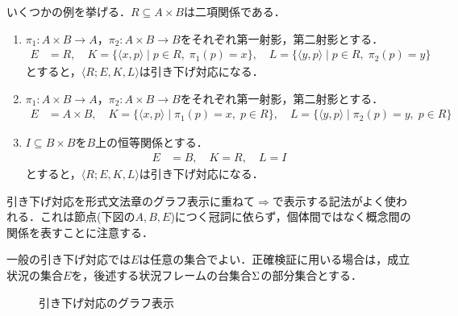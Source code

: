\documentclass[../../main-detail.tex]{subfiles}
\begin{document}
いくつかの例を挙げる．$R\subseteq A \times B$は二項関係である．
\begin{enumerate}
    \item $\pi_1:A\times B \to A$，$\pi_2:A\times B \to B$をそれぞれ第一射影，第二射影とする．
    \begin{align*}
        E &= R,\quad K = \{\langle x, p\rangle \mid p\in R,\; \pi_1(p) = x\},\quad L = \{\langle y, p\rangle \mid p\in R,\; \pi_2(p) = y\}
    \end{align*}
    とすると，$\langle R; E, K, L\rangle$は引き下げ対応になる．
    \item $\pi_1:A\times B \to A$，$\pi_2:A\times B \to B$をそれぞれ第一射影，第二射影とする．
    \begin{align*}
        E &= A\times B,\quad K = \{\langle x, p\rangle \mid \pi_1(p) = x,\; p\in R\},\quad L = \{\langle y, p\rangle \mid \pi_2(p) = y,\; p\in R\}
    \end{align*}
    \item $I \subseteq B\times B$を$B$上の恒等関係とする．
    \begin{align*}
        E &= B,\quad K = R,\quad L = I
    \end{align*}
    とすると，$\langle R; E, K, L\rangle$は引き下げ対応になる．
\end{enumerate}
引き下げ対応を形式文法章のグラフ表示に重ねて$\Rightarrow$で表示する記法がよく使われる．これは節点(下図の$A,B,E$)につく冠詞に依らず，個体間ではなく概念間の関係を表すことに注意する．
\begin{remark}
    一般の引き下げ対応では$E$は任意の集合でよい．正確検証に用いる場合は，成立状況の集合$E$を，後述する状況フレームの台集合$\Sigma$の部分集合とする．
\end{remark}
\begin{figure}[H]
    \centering
    \caption{引き下げ対応のグラフ表示}
\end{figure}
\end{document}

